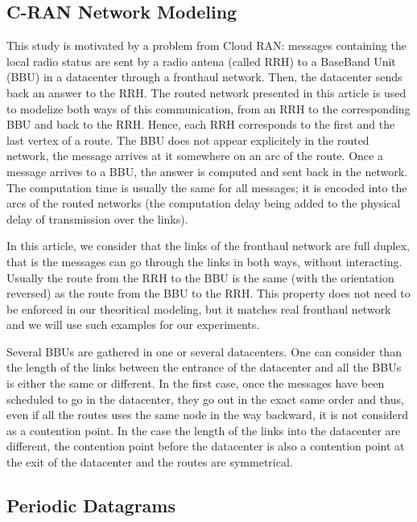 \documentclass[english]{article}
\begin{document}
  \subsection{C-RAN Network Modeling}
  \label{subsection:CRANGRAPH}
  This study is motivated by a problem from Cloud RAN:  messages containing the local radio status are sent by a radio antena (called RRH) to a BaseBand Unit (BBU) in a datacenter through a fronthaul network. Then, the datacenter sends back an answer to the RRH. The routed network presented in this article is used to modelize both ways of this communication, from an RRH to the corresponding BBU and back to the RRH. Hence, each RRH corresponds to the first and the last vertex of a route. The BBU does not appear explicitely in the routed network, the message arrives at it somewhere on an arc of the route. Once a message arrives to a BBU, the answer is computed and sent back in the network. The computation time is usually the same for all messages; it is encoded into the arcs of the routed networks (the computation delay being added to the physical delay of transmission over the links).
  
  In this article, we consider that the links of the fronthaul network are full duplex, that is the messages can go through the links in both ways, without interacting. Usually the route from the RRH to the BBU is the same (with the orientation reversed) as the route from the BBU to the RRH. This property does not need to be enforced in our theoritical modeling, but it matches real fronthaul network and we will use such examples for our experiments. 

  
    Several BBUs are gathered in one or several datacenters. One can consider than the length of the links between the entrance of the datacenter and all the BBUs is either the same or different. In the first case, once the messages have been scheduled to go in the datacenter, they go out in the exact same order and thus, even if all the routes uses the same node in the way backward, it is not considerd as a contention point. In the case the length of the links into the datacenter are different, the contention point before the datacenter is also a contention point at the exit of the datacenter and the routes are symmetrical.


     
  \subsection{Periodic Datagrams}
\end{document}
